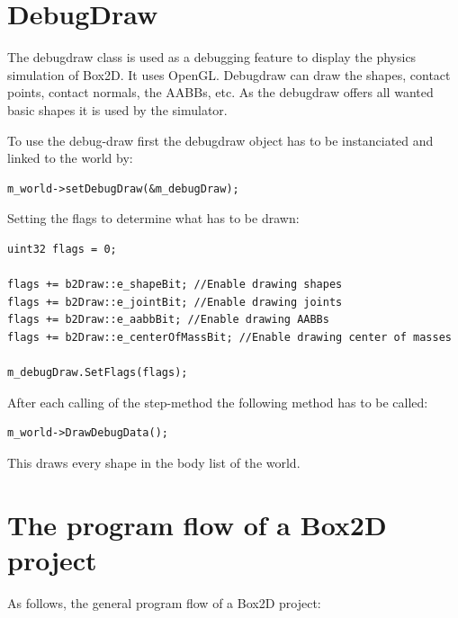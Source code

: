 \documentclass[10pt,a4paper,DIV=11]{scrreprt}
\begin{document}
\section{DebugDraw}
The debugdraw class is used as a debugging feature to display the physics simulation of Box2D. It uses OpenGL. Debugdraw can draw the shapes, contact points, contact normals, the AABBs, etc.
As the debugdraw offers all wanted basic shapes it is used by the simulator.

To use the debug-draw first the debugdraw object has to be instanciated and linked to the world by: \\

\begin{lstlisting}[caption={Registering a debugdraw instance to the world instance},label=lst:box2d-ddrawset]
m_world->setDebugDraw(&m_debugDraw);
\end{lstlisting}

Setting the flags to determine what has to be drawn:

\begin{lstlisting}[caption={Initializing DebugDraw},label=lst:box2d-ddrawinit]
uint32 flags = 0;

flags += b2Draw::e_shapeBit; //Enable drawing shapes
flags += b2Draw::e_jointBit; //Enable drawing joints
flags += b2Draw::e_aabbBit; //Enable drawing AABBs
flags += b2Draw::e_centerOfMassBit; //Enable drawing center of masses

m_debugDraw.SetFlags(flags);
\end{lstlisting}


After each calling of the step-method the following method has to be called: \\

\begin{lstlisting}[caption={Using debugdraw after each step},label=lst:box2d-ddraw]
m_world->DrawDebugData();
\end{lstlisting}

This draws every shape in the body list of the world.
 \newpage
\section{The program flow of a Box2D project}
As follows, the general program flow of a Box2D project: \\
\end{document}
